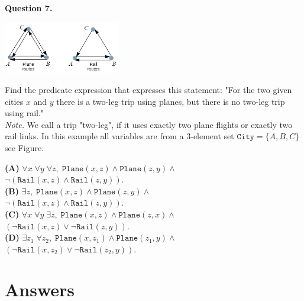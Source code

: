 \documentclass[jou]{apa6}
\begin{document}
\vspace{6pt}
{\bf Question 7.} 
\begin{center}
\includegraphics[width=2in]{relation-graphs.png}
\end{center}

Find the predicate expression that expresses this statement: 
"For the two given cities $x$ and $y$ there is a two-leg trip
using planes, but there is no two-leg trip using rail."\\
{\em Note.} We call a trip "two-leg", if it uses exactly two plane flights
or exactly two rail links. 
In this example all variables are from a 3-element set $\mathtt{City} = \{A,B,C\}$ 
\textendash{} see Figure. 


\noindent
{\bf (A)} $\forall x\;\forall y\; \forall z,\; \mathtt{Plane}(x,z) \wedge \mathtt{Plane}(z,y) \wedge$\\
$\neg \left( \mathtt{Rail}(x,z) \wedge \mathtt{Rail}(z,y) \right)$.\\[3pt]
{\bf (B)} $\exists z,\; \mathtt{Plane}(x,z) \wedge \mathtt{Plane}(z,y) \wedge$\\
$\neg \left(\mathtt{Rail}(x,z) \wedge \mathtt{Rail}(z,y)\right)$.\\[3pt]
{\bf (C)} $\forall x\; \forall y\; \exists z,\; \mathtt{Plane}(x,z) \wedge \mathtt{Plane}(z,x) \wedge$\\
$(\neg \mathtt{Rail}(x,z) \vee \neg \mathtt{Rail}(z,y))$.\\[3pt]
{\bf (D)} $\exists z_1\; \forall z_2,\; \mathtt{Plane}(x,z_1) \wedge \mathtt{Plane}(z_1,y) \wedge$\\
$(\neg \mathtt{Rail}(x,z_2) \vee \neg \mathtt{Rail}(z_2,y))$.


\section{Answers}
\end{document}
